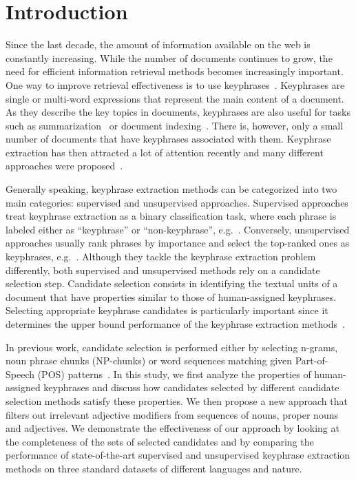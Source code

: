 \section{Introduction}
\label{sec:section}

  Since the last decade, the amount of information available on the web is
  constantly increasing. While the number of documents continues to grow, the
  need for efficient information retrieval methods becomes increasingly
  important. One way to improve retrieval effectiveness is to use
  keyphrases~\cite{jones1999phrasier}. Keyphrases are single or multi-word
  expressions that represent the main content of a document. As they describe
  the key topics in documents, keyphrases are also useful for tasks such as
  summarization~\cite{avanzo2005keyphrase} or document
  indexing~\cite{medelyan2008smalltrainingset}. There is, however, only a small
  number of documents that have keyphrases associated with them. Keyphrase
  extraction has then attracted a lot of attention recently and many different
  approaches were proposed~\cite{hasan2014state_of_the_art}.

  Generally speaking, keyphrase extraction methods can be categorized into two
  main categories: supervised and unsupervised approaches. Supervised approaches
  treat keyphrase extraction as a binary classification task, where each phrase
  is labeled either as ``keyphrase'' or ``non-keyphrase'',
  e.g.~\cite{witten1999kea}. Conversely, unsupervised approaches usually rank
  phrases by importance and select the top-ranked ones as keyphrases,
  e.g.~\cite{mihalcea2004textrank}. Although they tackle the keyphrase
  extraction problem differently, both supervised and unsupervised methods rely
  on a candidate selection step. Candidate selection consists in identifying the
  textual units of a document that have properties similar to those of
  human-assigned keyphrases. Selecting appropriate keyphrase candidates is
  particularly important since it determines the upper bound performance of the
  keyphrase extraction methods~\cite{wang2014keyphraseextractionpreprocessing}.

  In previous work, candidate selection is performed either by selecting
  n-grams, noun phrase chunks (NP-chunks) or word sequences matching given
  Part-of-Speech (POS) patterns~\cite{hulth2003keywordextraction}. In this
  study, we first analyze the properties of human-assigned keyphrases and
  discuss how candidates selected by different candidate selection methods
  satisfy these properties. We then propose a new approach that filters out
  irrelevant adjective modifiers from sequences of nouns, proper nouns and
  adjectives. We demonstrate the effectiveness of our approach by looking at the
  completeness of the sets of selected candidates and by comparing the
  performance of state-of-the-art supervised and unsupervised keyphrase
  extraction methods on three standard datasets of different languages and
  nature.

